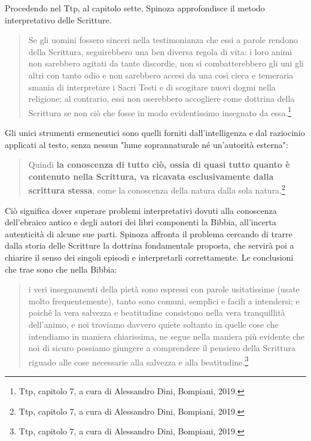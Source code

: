 Procedendo nel Ttp, al capitolo sette, Spinoza approfondisce il metodo interpretativo delle Scritture. 

\begin{quotation}
	\small Se gli uomini fossero sinceri nella testimonianza che essi a parole rendono della
	Scrittura, seguirebbero una ben diversa regola di vita: i loro animi non sarebbero
	agitati da tante discordie, non si combatterebbero gli uni gli altri con tanto odio
	e non sarebbero accesi da una così cieca e temeraria smania di interpretare i Sacri
	Testi e di scogitare nuovi dogmi nella religione; al contrario, essi non oserebbero
	accogliere come dottrina della Scrittura se non ciò che fosse in modo evidentissimo
	insegnato da essa.\footnote{Ttp, capitolo 7, a cura di Alessandro Dini, Bompiani, 2019.}
\end{quotation}

Gli unici strumenti ermeneutici sono quelli forniti dall'intelligenza e dal raziocinio applicati al testo, senza nessun "lume soprannaturale né un’autorità esterna":

\begin{quotation}
	\small Quindi \textbf{la conoscenza di
	tutto ciò, ossia di quasi tutto quanto è contenuto nella Scrittura, va ricavata
	esclusivamente dalla scrittura stessa}, come la conoscenza della natura dalla sola
	natura.\footnote{Ttp, capitolo 7, a cura di Alessandro Dini, Bompiani, 2019.}
\end{quotation}

Ciò significa dover superare problemi interpretativi dovuti alla conoscenza dell'ebraico antico e degli autori dei libri componenti la Bibbia, all'incerta autenticità di alcune sue parti. Spinoza affronta il problema cercando di trarre dalla storia delle Scritture la dottrina fondamentale proposta, che servirà poi a chiarire il senso dei singoli episodi e interpretarli correttamente. Le conclusioni che trae sono che nella Bibbia:

\begin{quotation}
	\small i veri insegnamenti della pietà sono espressi con parole usitatissime (usate molto frequentemente), tanto sono comuni, semplici e facili a intendersi; e poiché la vera salvezza e beatitudine consistono nella vera tranquillità dell'animo, e noi troviamo davvero quiete soltanto in quelle cose che intendiamo in maniera chiarissima, ne segue nella maniera più evidente che noi di sicuro possiamo giungere a comprendere il pensiero della Scrittura riguado alle cose necessarie alla salvezza e alla beatitudine.\footnote{Ttp, capitolo 7, a cura di Alessandro Dini, Bompiani, 2019.}
\end{quotation}


